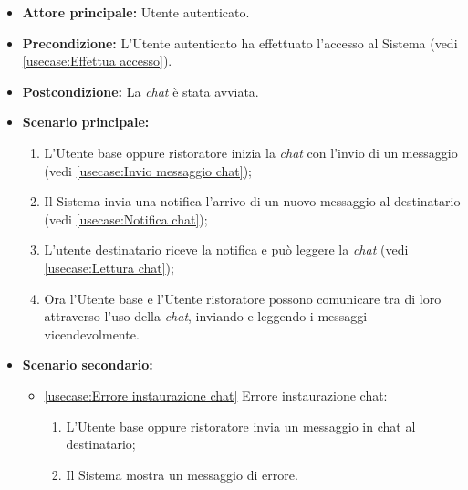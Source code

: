 \label{usecase:Chat Utente base}
\begin{itemize}
	\item \textbf{Attore principale:} Utente autenticato.

	\item \textbf{Precondizione:} L'Utente autenticato ha effettuato l'accesso al Sistema (vedi \autoref{usecase:Effettua accesso}).


	\item \textbf{Postcondizione:} La \textit{chat} è stata avviata.

	\item \textbf{Scenario principale:}
            \begin{enumerate}
                \item L'Utente base oppure ristoratore inizia la \textit{chat} con l'invio di un messaggio (vedi \autoref{usecase:Invio messaggio chat});
                \item Il Sistema invia una notifica l'arrivo di un nuovo messaggio al destinatario (vedi \autoref{usecase:Notifica chat});
                \item L'utente destinatario riceve la notifica e può leggere la \textit{chat} (vedi \autoref{usecase:Lettura chat});
                \item Ora l'Utente base e l'Utente ristoratore possono comunicare tra di loro attraverso l'uso della \textit{chat}, inviando e leggendo i messaggi vicendevolmente.
	      \end{enumerate}

    \item \textbf{Scenario secondario:}
		  \begin{itemize}
			  \item \autoref{usecase:Errore instaurazione chat} Errore instaurazione chat:
				\begin{enumerate}
					\item L'Utente base oppure ristoratore invia un messaggio in chat al destinatario;
					\item Il Sistema mostra un messaggio di errore.
				\end{enumerate}
		  \end{itemize}
\end{itemize}